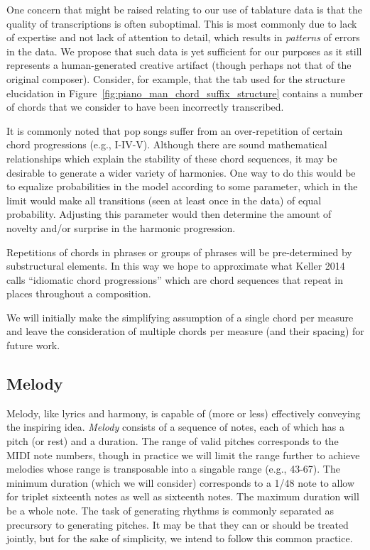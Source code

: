 \documentclass[11pt,phd]{byuprop}
\begin{document}
One concern that might be raised relating to our use of tablature data is that the quality of transcriptions is often suboptimal. This is most commonly due to lack of expertise and not lack of attention to detail, which results in \emph{patterns} of errors in the data. We propose that such data is yet sufficient for our purposes as it still represents a human-generated creative artifact (though perhaps not that of the original composer). Consider, for example, that the tab used for the structure elucidation in Figure~\ref{fig:piano_man_chord_suffix_structure} contains a number of chords that we consider to have been incorrectly transcribed.

It is commonly noted that pop songs suffer from an over-repetition of certain chord progressions (e.g., I-IV-V). Although there are sound mathematical relationships which explain the stability of these chord sequences, it may be desirable to generate a wider variety of harmonies. One way to do this would be to equalize probabilities in the model according to some parameter, which in the limit would make all transitions (seen at least once in the data) of equal probability. Adjusting this parameter would then determine the amount of novelty and/or surprise in the harmonic progression.

Repetitions of chords in phrases or groups of phrases will be pre-determined by substructural elements. In this way we hope to approximate what Keller 2014 calls ``idiomatic chord progressions'' which are chord sequences that repeat in places throughout a composition.


We will initially make the simplifying assumption of a single chord per measure and leave the consideration of multiple chords per measure (and their spacing) for future work.

\subsection{Melody}

Melody, like lyrics and harmony, is capable of (more or less) effectively conveying the inspiring idea. \emph{Melody} consists of a sequence of notes, each of which has a pitch (or rest) and a duration. The range of valid pitches corresponds to the MIDI note numbers, though in practice we will limit the range further to achieve melodies whose range is transposable into a singable range (e.g., 43-67). The minimum duration (which we will consider) corresponds to a 1/48 note to allow for triplet sixteenth notes as well as sixteenth notes. The maximum duration will be a whole note. The task of generating rhythms is commonly separated as precursory to generating pitches. It may be that they can or should be treated jointly, but for the sake of simplicity, we intend to follow this common practice.
\end{document}
